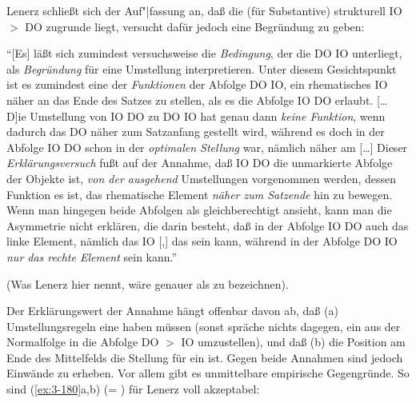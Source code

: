 \documentclass[output=paper]{langsci/langscibook}
\begin{document}
\addlines
Lenerz schließt sich der Auf"|fassung an, daß die (für Substantive)
strukturell  IO $>$ DO zugrunde liegt, versucht dafür
jedoch eine Begründung zu geben:
\begin{exe}
\ex \label{ex:3-179}
"`[Es] läßt sich zumindest versuchsweise die \textit{Bedingung}, der die
 DO IO unterliegt, als \textit{Begründung} für eine Umstellung
interpretieren. Unter diesem Gesichtspunkt ist es zumindest eine der
\textit{Funktionen} der Abfolge DO IO, ein rhematisches IO näher an das Ende
des Satzes zu stellen, als es die Abfolge IO DO erlaubt. [\ldots{} D]ie
Umstellung von IO DO zu DO IO hat genau dann \textit{keine Funktion}, wenn
dadurch das  DO näher zum Satzanfang gestellt wird, während es
doch in der Abfolge IO DO schon in der \textit{optimalen Stellung} war, nämlich
näher am  [\ldots] Dieser \textit{Erklärungsversuch} fußt auf der Annahme,
daß IO DO die unmarkierte Abfolge der Objekte ist, \textit{von der ausgehend}
Umstellungen vorgenommen werden, dessen Funktion es ist, das
rhematische Element \textit{näher zum Satzende} hin zu bewegen. Wenn man
hingegen beide Abfolgen als gleichberechtigt ansieht, kann man die
Asymmetrie nicht erklären, die darin besteht, daß in der Abfolge IO DO
auch das linke Element, nämlich das IO [,] das  sein kann,
während in der Abfolge DO IO \textit{nur das rechte Element}  sein kann."'
\citep[45; Hervorhebungen von mir]{Lenerz77}
\end{exe}
(Was Lenerz hier  nennt, wäre genauer als  zu bezeichnen).

Der Erklärungswert der Annahme hängt offenbar davon ab, daß (a)
Umstellungsregeln eine  haben müssen
(sonst spräche nichts dagegen, ein  aus der
Normalfolge in die Abfolge DO $>$ IO umzustellen), und daß (b) die
Position am Ende des Mittelfelds die  Stellung für
ein  ist. Gegen beide Annahmen sind jedoch Einwände zu
erheben. Vor allem gibt es unmittelbare empirische Gegengründe. So
sind (\ref{ex:3-180}a,b) (= \citealt[44 (5a,b)]{Lenerz77}) für Le\-nerz voll akzeptabel:

\end{document}

